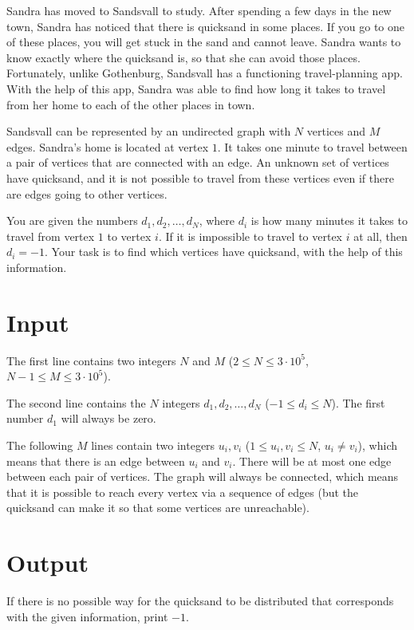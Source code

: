\noindent

Sandra has moved to Sandsvall to study. After spending a few days in the new town, Sandra
has noticed that there is quicksand in some places. If you go to one of these places, you 
will get stuck in the sand and cannot leave. Sandra wants to know exactly where the quicksand
is, so that she can avoid those places. Fortunately, unlike Gothenburg, Sandsvall has a functioning 
travel-planning app. With the help of this app, Sandra was able to find how long it takes to 
travel from her home to each of the other places in town.

Sandsvall can be represented by an undirected graph with $N$ vertices and $M$ edges.
Sandra's home is located at vertex $1$. It takes one minute to travel between a pair of 
vertices that are connected with an edge. An unknown set of vertices have quicksand, and 
it is not possible to travel from these vertices even if there are edges going to other vertices.

You are given the numbers $d_1, d_2, \dots, d_N$, where $d_i$ is how many minutes it takes to travel from 
vertex $1$ to vertex $i$. If it is impossible to travel to vertex $i$ at all, then $d_i = -1$.
Your task is to find which vertices have quicksand, with the help of this information.

\section*{Input}

The first line contains two integers $N$ and $M$ ($2 \leq N \leq 3 \cdot 10^5$, $N-1 \leq M \leq 3 \cdot 10^5$).

The second line contains the $N$ integers $d_1, d_2, \dots, d_N$ ($-1 \leq d_i \leq N$). The first number 
$d_1$ will always be zero.

The following $M$ lines contain two integers $u_i, v_i$ ($1 \leq u_i, v_i \leq N$, $u_i \neq v_i$), which means 
that there is an edge between $u_i$ and $v_i$. There will be at most one edge between each pair of vertices.
The graph will always be connected, which means that it is possible to reach every vertex
via a sequence of edges (but the quicksand can make it so that some vertices are unreachable).

\section*{Output}

If there is no possible way for the quicksand to be distributed that corresponds with 
the given information, print $-1$.

